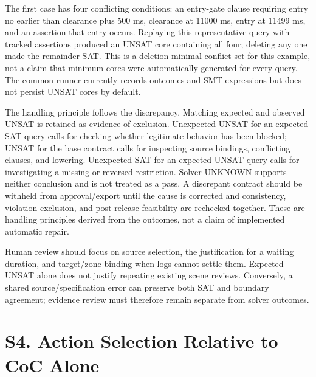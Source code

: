 \documentclass[11pt,a4paper]{article}
\begin{document}
The first case has four conflicting conditions: an entry-gate clause requiring entry no earlier than clearance plus 500 ms, clearance at 11000 ms, entry at 11499 ms, and an assertion that entry occurs. Replaying this representative query with tracked assertions produced an UNSAT core containing all four; deleting any one made the remainder SAT. This is a deletion-minimal conflict set for this example, not a claim that minimum cores were automatically generated for every query. The common runner currently records outcomes and SMT expressions but does not persist UNSAT cores by default.\par

The handling principle follows the discrepancy. Matching expected and observed UNSAT is retained as evidence of exclusion. Unexpected UNSAT for an expected-SAT query calls for checking whether legitimate behavior has been blocked; UNSAT for the base contract calls for inspecting source bindings, conflicting clauses, and lowering. Unexpected SAT for an expected-UNSAT query calls for investigating a missing or reversed restriction. Solver UNKNOWN supports neither conclusion and is not treated as a pass. A discrepant contract should be withheld from approval/export until the cause is corrected and consistency, violation exclusion, and post-release feasibility are rechecked together. These are handling principles derived from the outcomes, not a claim of implemented automatic repair.\par

Human review should focus on source selection, the justification for a waiting duration, and target/zone binding when logs cannot settle them. Expected UNSAT alone does not justify repeating existing scene reviews. Conversely, a shared source/specification error can preserve both SAT and boundary agreement; evidence review must therefore remain separate from solver outcomes.\par

\section*{S4. Action Selection Relative to CoC Alone}
\end{document}

